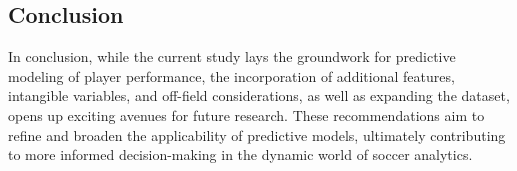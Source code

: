 \documentclass[12pt]{article}
\begin{document}
\subsection{Conclusion}

In conclusion, while the current study lays the groundwork for predictive
modeling of player performance, the incorporation of additional features,
intangible variables, and off-field considerations, as well as expanding the
dataset, opens up exciting avenues for future research. These recommendations
aim to refine and broaden the applicability of predictive models, ultimately
contributing to more informed decision-making in the dynamic world of soccer
analytics.

















 
\end{document}
